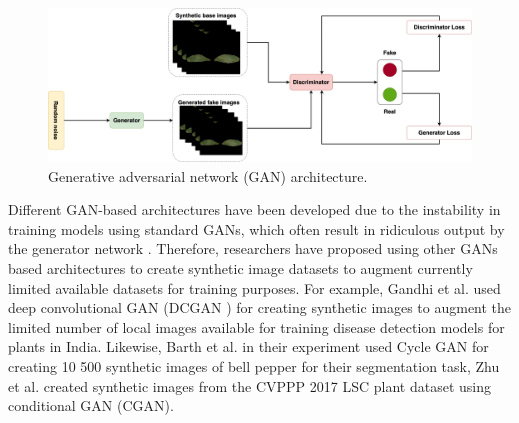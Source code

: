 \begin{figure}[!htb]
    \includegraphics[scale=0.25, keepaspectratio]{Figures/gan.png}
    \caption{Generative adversarial network (GAN) architecture.}
    \label{fig:my_gan}
\end{figure}

Different GAN-based architectures have been developed due to the instability in training models using standard GANs, which often result in ridiculous output by the generator network \cite{radford2015unsupervised}. Therefore, researchers have proposed using other GANs based architectures to create synthetic image datasets to augment currently limited available datasets for training purposes. For example,  Gandhi et al. \cite{gandhi2018plant} used deep convolutional GAN (DCGAN \cite{radford2015unsupervised}) for creating synthetic images to augment the limited number of local images available for training disease detection models for plants in India. Likewise, Barth et al. \cite{barth2020optimising} in their experiment used Cycle GAN for creating 10 500 synthetic images of bell pepper for their segmentation task, Zhu et al. \cite{zhu2018data} created synthetic images from the CVPPP 2017 LSC plant dataset using conditional GAN (CGAN).


